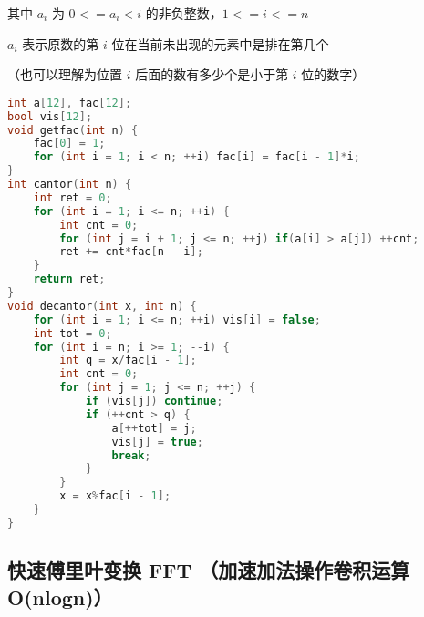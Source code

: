 其中 $a_i$ 为 $0 <= a_i < i$ 的非负整数，$1 <= i <= n$

$a_i$ 表示原数的第 $i$ 位在当前未出现的元素中是排在第几个

（也可以理解为位置 $i$ 后面的数有多少个是小于第 $i$ 位的数字）

\begin{lstlisting}[language=C++]
int a[12], fac[12];
bool vis[12];
void getfac(int n) {
    fac[0] = 1;
    for (int i = 1; i < n; ++i) fac[i] = fac[i - 1]*i;
}
int cantor(int n) {
    int ret = 0;
    for (int i = 1; i <= n; ++i) {
        int cnt = 0;
        for (int j = i + 1; j <= n; ++j) if(a[i] > a[j]) ++cnt;
        ret += cnt*fac[n - i];
    }
    return ret;
}
void decantor(int x, int n) {
    for (int i = 1; i <= n; ++i) vis[i] = false;
    int tot = 0;
    for (int i = n; i >= 1; --i) {
        int q = x/fac[i - 1];
        int cnt = 0;
        for (int j = 1; j <= n; ++j) {
            if (vis[j]) continue;
            if (++cnt > q) {
                a[++tot] = j;
                vis[j] = true;
                break;
            }
        }
        x = x%fac[i - 1];
    }
}
\end{lstlisting}

\subsection{快速傅里叶变换 FFT （加速加法操作卷积运算 O(nlogn)）}

